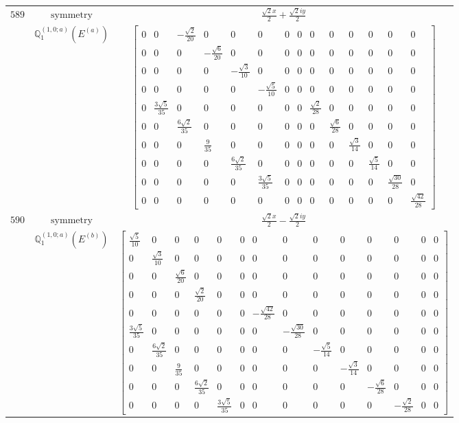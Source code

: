 \documentclass[fleqn,8pt,landscape]{jsarticle}
\begin{document}
\begin{longtable}{ccc}
$ 589 $ & $ \text{symmetry} $ & $ \frac{\sqrt{2} x}{2} + \frac{\sqrt{2} i y}{2} $ \\
$  $ & $ \mathbb{Q}_{1}^{(1,0;a)}(E^{(a)}) $ & $ \begin{bmatrix} 0 & 0 & - \frac{\sqrt{2}}{20} & 0 & 0 & 0 & 0 & 0 & 0 & 0 & 0 & 0 & 0 & 0 \\ 0 & 0 & 0 & - \frac{\sqrt{6}}{20} & 0 & 0 & 0 & 0 & 0 & 0 & 0 & 0 & 0 & 0 \\ 0 & 0 & 0 & 0 & - \frac{\sqrt{3}}{10} & 0 & 0 & 0 & 0 & 0 & 0 & 0 & 0 & 0 \\ 0 & 0 & 0 & 0 & 0 & - \frac{\sqrt{5}}{10} & 0 & 0 & 0 & 0 & 0 & 0 & 0 & 0 \\ 0 & \frac{3 \sqrt{5}}{35} & 0 & 0 & 0 & 0 & 0 & 0 & \frac{\sqrt{2}}{28} & 0 & 0 & 0 & 0 & 0 \\ 0 & 0 & \frac{6 \sqrt{2}}{35} & 0 & 0 & 0 & 0 & 0 & 0 & \frac{\sqrt{6}}{28} & 0 & 0 & 0 & 0 \\ 0 & 0 & 0 & \frac{9}{35} & 0 & 0 & 0 & 0 & 0 & 0 & \frac{\sqrt{3}}{14} & 0 & 0 & 0 \\ 0 & 0 & 0 & 0 & \frac{6 \sqrt{2}}{35} & 0 & 0 & 0 & 0 & 0 & 0 & \frac{\sqrt{5}}{14} & 0 & 0 \\ 0 & 0 & 0 & 0 & 0 & \frac{3 \sqrt{5}}{35} & 0 & 0 & 0 & 0 & 0 & 0 & \frac{\sqrt{30}}{28} & 0 \\ 0 & 0 & 0 & 0 & 0 & 0 & 0 & 0 & 0 & 0 & 0 & 0 & 0 & \frac{\sqrt{42}}{28} \end{bmatrix} $ \\ \hline
$ 590 $ & $ \text{symmetry} $ & $ \frac{\sqrt{2} x}{2} - \frac{\sqrt{2} i y}{2} $ \\
$  $ & $ \mathbb{Q}_{1}^{(1,0;a)}(E^{(b)}) $ & $ \begin{bmatrix} \frac{\sqrt{5}}{10} & 0 & 0 & 0 & 0 & 0 & 0 & 0 & 0 & 0 & 0 & 0 & 0 & 0 \\ 0 & \frac{\sqrt{3}}{10} & 0 & 0 & 0 & 0 & 0 & 0 & 0 & 0 & 0 & 0 & 0 & 0 \\ 0 & 0 & \frac{\sqrt{6}}{20} & 0 & 0 & 0 & 0 & 0 & 0 & 0 & 0 & 0 & 0 & 0 \\ 0 & 0 & 0 & \frac{\sqrt{2}}{20} & 0 & 0 & 0 & 0 & 0 & 0 & 0 & 0 & 0 & 0 \\ 0 & 0 & 0 & 0 & 0 & 0 & - \frac{\sqrt{42}}{28} & 0 & 0 & 0 & 0 & 0 & 0 & 0 \\ \frac{3 \sqrt{5}}{35} & 0 & 0 & 0 & 0 & 0 & 0 & - \frac{\sqrt{30}}{28} & 0 & 0 & 0 & 0 & 0 & 0 \\ 0 & \frac{6 \sqrt{2}}{35} & 0 & 0 & 0 & 0 & 0 & 0 & - \frac{\sqrt{5}}{14} & 0 & 0 & 0 & 0 & 0 \\ 0 & 0 & \frac{9}{35} & 0 & 0 & 0 & 0 & 0 & 0 & - \frac{\sqrt{3}}{14} & 0 & 0 & 0 & 0 \\ 0 & 0 & 0 & \frac{6 \sqrt{2}}{35} & 0 & 0 & 0 & 0 & 0 & 0 & - \frac{\sqrt{6}}{28} & 0 & 0 & 0 \\ 0 & 0 & 0 & 0 & \frac{3 \sqrt{5}}{35} & 0 & 0 & 0 & 0 & 0 & 0 & - \frac{\sqrt{2}}{28} & 0 & 0 \end{bmatrix} $ \\ \hline

\end{longtable}
\end{document}

